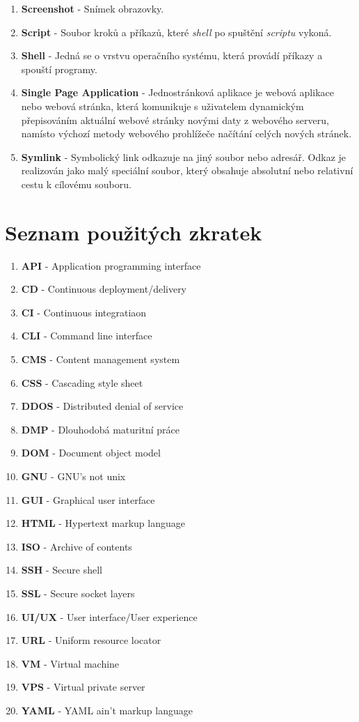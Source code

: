 \documentclass[12pt,a4paper]{report}
\begin{document}
\begin{enumerate}
    \item \textbf{Screenshot} - Snímek obrazovky.
    \item \textbf{Script} - Soubor kroků a příkazů, které \emph{shell} po spuštění \emph{scriptu} vykoná.
    \item \textbf{Shell} - Jedná se o vrstvu operačního systému, která provádí příkazy a spouští programy.
    \item \textbf{Single Page Application} - Jednostránková aplikace je webová aplikace nebo webová stránka, která komunikuje s uživatelem dynamickým přepisováním aktuální webové stránky novými daty z webového serveru, namísto výchozí metody webového prohlížeče načítání celých nových stránek.
    \item \textbf{Symlink} - Symbolický link odkazuje na jiný soubor nebo adresář. Odkaz je realizován jako malý speciální soubor, který obsahuje absolutní nebo relativní cestu k cílovému souboru.
  \end{enumerate}

  \clearpage
  \section{Seznam použitých zkratek}
  \begin{enumerate}
    \item \textbf{API} - Application programming interface
    \item \textbf{CD} - Continuous deployment/delivery
    \item \textbf{CI} - Continuous integratiaon
    \item \textbf{CLI} - Command line interface
    \item \textbf{CMS} - Content management system
    \item \textbf{CSS} - Cascading style sheet
    \item \textbf{DDOS} - Distributed denial of service
    \item \textbf{DMP} - Dlouhodobá maturitní práce
    \item \textbf{DOM} - Document object model
    \item \textbf{GNU} - GNU's not unix
    \item \textbf{GUI} - Graphical user interface
    \item \textbf{HTML} - Hypertext markup language
    \item \textbf{ISO} - Archive of contents
    \item \textbf{SSH} - Secure shell
    \item \textbf{SSL}  - Secure socket layers
    \item \textbf{UI/UX} - User interface/User experience
    \item \textbf{URL} - Uniform resource locator
    \item \textbf{VM} - Virtual machine
    \item \textbf{VPS} - Virtual private server
    \item \textbf{YAML} - YAML ain't markup language
  
  \end{enumerate}
\end{document}
